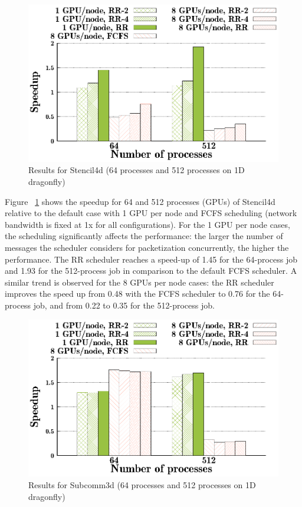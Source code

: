 \begin{figure}[t]
  \centering
  \includegraphics[width=0.8\columnwidth]{figure/plots/sched/dfly-sched-mapping-stencil.eps}
  \vspace{-0.5in}
  \caption{Results for Stencil4d (64 processes and 512 processes on 1D dragonfly)}
  \label{fig:stencil_scheduling_dfly}
\end{figure}


Figure ~\ref{fig:stencil_scheduling_dfly} shows the speedup for 64 and 512
processes (GPUs) of Stencil4d relative to the default case with 1 GPU per node and
FCFS scheduling (network bandwidth is fixed at 1x for all configurations).  For
the 1 GPU per node cases, the scheduling significantly affects the performance:
the larger the number of messages the scheduler considers for packetization
concurrently, the higher the performance. The RR scheduler reaches a speed-up of
1.45 for the 64-process job and 1.93 for the 512-process job in comparison to
the default FCFS scheduler. A similar trend is observed for the 8 GPUs per node
cases: the RR scheduler improves the speed up from 0.48 with the FCFS scheduler to 0.76
for the 64-process job, and from 0.22 to 0.35 for the 512-process job. 

\begin{figure}[t]
\centering
  \includegraphics[width=0.8\columnwidth]{figure/plots/sched/dfly-sched-mapping-subcom.eps}
  \vspace{-0.5in}
  \caption{Results for Subcomm3d (64 processes and 512 processes on 1D dragonfly)}
  \label{fig:subcomm3d_scheduling_dfly}
\end{figure}


